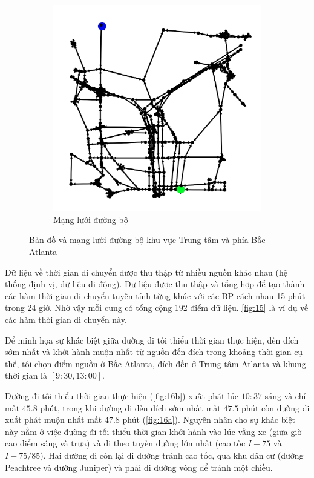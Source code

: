 \documentclass[../main.tex]{subfiles}
\begin{document}
\begin{figure}
\begin{subfigure}{0.45\textwidth}
        \includegraphics{edited-images/Figure14b.jpg}
        \caption{Mạng lưới đường bộ}
        \label{fig:14b}
    \end{subfigure}
    \caption{Bản đồ và mạng lưới đường bộ khu vực Trung tâm và phía Bắc Atlanta}
    \label{fig:14}
\end{figure}

Dữ liệu về thời gian di chuyển được thu thập từ nhiều nguồn khác nhau
(hệ thống định vị, dữ liệu di động). Dữ liệu được thu thập và tổng hợp
để tạo thành các hàm thời gian di chuyển tuyến tính từng khúc với các BP
cách nhau 15 phút trong 24 giờ. Nhờ vậy mỗi cung có tổng cộng 192 điểm
dữ liệu. \autoref{fig:15} là ví dụ về các hàm thời gian di chuyển
này.


Để minh họa sự khác biệt giữa đường đi tối thiểu thời gian thực hiện,
đến đích sớm nhất và khởi hành muộn nhất từ nguồn đến đích trong khoảng
thời gian cụ thể, tôi chọn điểm nguồn ở Bắc Atlanta, đích đến ở Trung
tâm Atlanta và khung thời gian là \([9:30, 13:00]\).


Đường đi tối thiểu thời gian thực
hiện (\autoref{fig:16b}) xuất phát lúc \(10:37\) sáng và chỉ mất \(45.8\) phút,
trong khi đường đi đến đích sớm nhất mất \(47.5\) phút còn đường đi xuất
phát muộn nhất mất \(47.8\) phút (\autoref{fig:16a}). Nguyên nhân cho sự khác
biệt này nằm ở việc đường đi tối thiểu thời gian khởi hành vào lúc vắng
xe (giữa giờ cao điểm sáng và trưa) và đi theo tuyến đường lớn nhất (cao
tốc \(I-75\) và \(I-75/85\)). Hai đường đi còn lại đi đường tránh cao
tốc, qua khu dân cư (đường Peachtree và đường Juniper) và phải đi đường vòng
để tránh một chiều.
\end{document}
